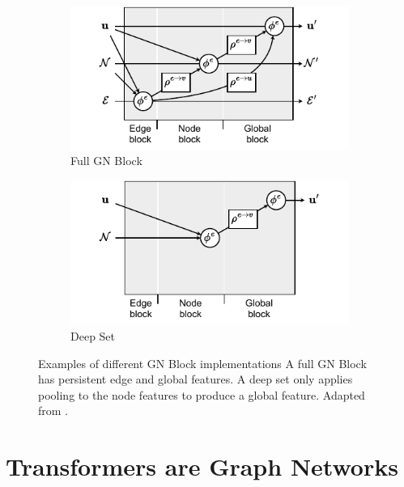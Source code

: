 \begin{figure}
    \centering
    \begin{subfigure}[b]{0.49\textwidth}
        \centering
        \includegraphics[width=\textwidth]{Figures/graph_networks/full_gn.pdf}
        \caption{Full GN Block}
        \label{fig:full_gn_block}
    \end{subfigure}
    \begin{subfigure}[b]{0.49\textwidth}
        \centering
        \includegraphics[width=\textwidth]{Figures/graph_networks/deepset.pdf}
        \caption{Deep Set}
        \label{fig:deep_set}
    \end{subfigure}
    \caption{Examples of different GN Block implementations  A full GN Block has persistent edge and global features.  A deep set only applies pooling to the node features to produce a global feature. Adapted from \textcite{RelationalInductiveBiases}.}
\end{figure}

\section{Transformers are Graph Networks}
\label{sec:transformers}

